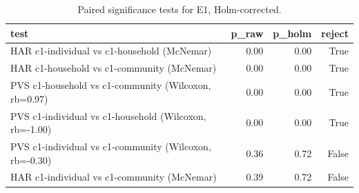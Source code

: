 \begin{table}[t]
\centering
\small
\caption{Paired significance tests for E1, Holm-corrected.}
\label{tab:e1-tests}
\begin{tabular}{lrrr}
\toprule
test & p\_raw & p\_holm & reject \\
\midrule
HAR c1-individual vs c1-household (McNemar) & 0.00 & 0.00 & True \\
HAR c1-household vs c1-community (McNemar) & 0.00 & 0.00 & True \\
PVS c1-household vs c1-community (Wilcoxon, rb=0.97) & 0.00 & 0.00 & True \\
PVS c1-individual vs c1-household (Wilcoxon, rb=-1.00) & 0.00 & 0.00 & True \\
PVS c1-individual vs c1-community (Wilcoxon, rb=-0.30) & 0.36 & 0.72 & False \\
HAR c1-individual vs c1-community (McNemar) & 0.39 & 0.72 & False \\
\bottomrule
\end{tabular}
\end{table}
